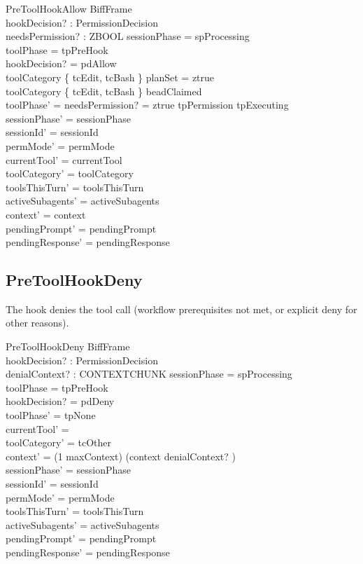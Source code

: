 \documentclass[a4paper,10pt,fleqn]{article}
\begin{document}
\begin{schema}{PreToolHookAllow}
  BiffFrame \\
  hookDecision? : PermissionDecision \\
  needsPermission? : ZBOOL
  \where
  sessionPhase = spProcessing \\
  toolPhase = tpPreHook \\
  hookDecision? = pdAllow \\
  toolCategory \in \{ tcEdit, tcBash \} \implies planSet = ztrue \\
  toolCategory \in \{ tcEdit, tcBash \} \implies beadClaimed \neq \emptyset \\
  toolPhase' = \IF needsPermission? = ztrue \THEN tpPermission \ELSE tpExecuting \\
  sessionPhase' = sessionPhase \\
  sessionId' = sessionId \\
  permMode' = permMode \\
  currentTool' = currentTool \\
  toolCategory' = toolCategory \\
  toolsThisTurn' = toolsThisTurn \\
  activeSubagents' = activeSubagents \\
  context' = context \\
  pendingPrompt' = pendingPrompt \\
  pendingResponse' = pendingResponse
\end{schema}

\subsection{PreToolHookDeny}

The hook denies the tool call (workflow prerequisites not met,
or explicit deny for other reasons).

\begin{schema}{PreToolHookDeny}
  BiffFrame \\
  hookDecision? : PermissionDecision \\
  denialContext? : CONTEXTCHUNK
  \where
  sessionPhase = spProcessing \\
  toolPhase = tpPreHook \\
  hookDecision? = pdDeny \\
  toolPhase' = tpNone \\
  currentTool' = \emptyset \\
  toolCategory' = tcOther \\
  context' = (1 \upto maxContext) \dres (context \cat \langle denialContext? \rangle) \\
  sessionPhase' = sessionPhase \\
  sessionId' = sessionId \\
  permMode' = permMode \\
  toolsThisTurn' = toolsThisTurn \\
  activeSubagents' = activeSubagents \\
  pendingPrompt' = pendingPrompt \\
  pendingResponse' = pendingResponse
\end{schema}
\end{document}
